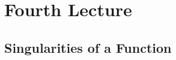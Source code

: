 \setchapterpreamble[u]{\margintoc}
\chapter{Fourth Lecture}

\section{Singularities of a Function}

\blindtext

